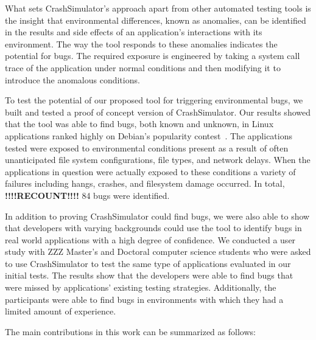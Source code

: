 What sets CrashSimulator's approach apart from other automated testing
tools is the insight that environmental differences, known as anomalies,
can be identified
in the results and side effects of an application's interactions with its
environment.  The way the tool responds to these anomalies indicates the
potential for bugs.
The required exposure is engineered by taking a
system call trace of the application under normal conditions and
then modifying it to introduce the anomalous conditions.

To test the potential of our proposed tool for triggering environmental
bugs, we built and tested a proof of concept version of
CrashSimulator.  Our results showed that the tool was able to find bugs,
both known and unknown,
in Linux applications ranked highly on Debian's popularity
contest~\cite{DebPopCon}.  The applications tested were exposed to
environmental conditions present as a result of often unanticipated
file system configurations, file types, and network delays.
When the applications in
question were actually exposed to these conditions a variety of failures
including hangs, crashes, and filesystem damage occurred.  In total,
\textbf{!!!!RECOUNT!!!!} 84
bugs were identified.

In addition to proving CrashSimulator could find bugs, we were also able to
show that developers with varying backgrounds
could use the tool to identify bugs
in real world applications
with a high degree of confidence.
We conducted a user study with
ZZZ Master's and Doctoral computer science students
who were asked to use CrashSimulator to test
the same type of applications evaluated in our initial tests.
The results show that the developers were able to find bugs
that were missed by applications' existing testing strategies.
Additionally, the
participants were able to find bugs
in environments with which they had a limited amount of experience.

The main contributions in this work can be summarized as follows:

